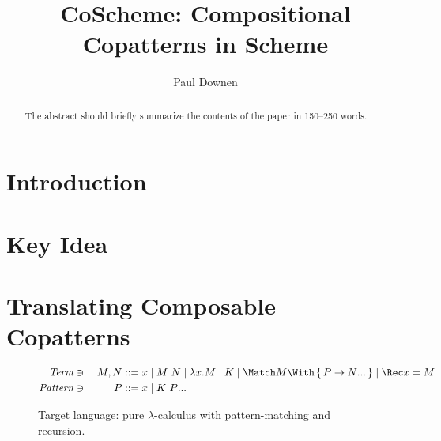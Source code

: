 \documentclass[runningheads]{llncs}
\begin{document}
%
\title{CoScheme: Compositional Copatterns in Scheme}
%
%
\author{Paul Downen}
%
%
%
\maketitle              %
%
\begin{abstract}
The abstract should briefly summarize the contents of the paper in
150--250 words.

\end{abstract}
%
%
%
\section{Introduction}

\section{Key Idea}

\section{Translating Composable Copatterns}

\begin{figure}
\centering
\begin{alignat*}{2}
  \mathit{Term} &\ni{}& M, N
  &::= x
  \mid M ~ N
  \mid \lambda x. M
  \mid K
  \mid \Match M \With \set{\many{P \to N}}
  \mid \Rec x = M
  \\
  \mathit{Pattern} &\ni{}& P
  &::= x
  \mid K ~ \many{P}
\end{alignat*}

\caption{Target language: pure $\lambda$-calculus with pattern-matching and recursion.}
\label{fig:target-syntax}
\end{figure}
\end{document}
